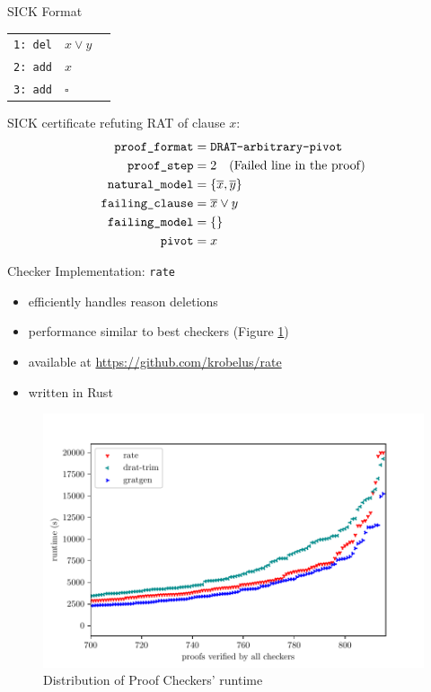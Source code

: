 \documentclass[final,hyperref={pdfpagelabels=true}]{beamer}
\begin{document}
\begin{frame}[fragile]
\begin{columns}[t]
\begin{column}{.45\textwidth}
\begin{block}{SICK Format}
	\begin{tabular}{lll}
    		\texttt{1: del} & $x \lor y$		& \\
    		\texttt{2: add} & $x$			& \\
    		\texttt{3: add} & $\square$		& \\
	\end{tabular}

        \vspace{.5cm}
	SICK certificate refuting RAT of clause $x$:
        \begin{align*}
            \texttt{proof\_format}	&= \texttt{DRAT-arbitrary-pivot}		\\
	    \texttt{proof\_step}	&= 2 \text{\quad (Failed line in the proof)}	\\
	    \texttt{natural\_model}	&= \{\overline{x}, \overline{y}\}		\\
	    \texttt{failing\_clause}	&= \overline{x} \lor y				\\
	    \texttt{failing\_model}	&= \{\}						\\
	    \texttt{pivot}		&= x						
        \end{align*}
    \end{block}
    \begin{block}{Checker Implementation: \texttt{rate}}
        \begin{itemize}
            \item efficiently handles reason deletions
            \item performance similar to best checkers (Figure \ref{fig:cactus-time3})
            \item available at \url{https://github.com/krobelus/rate}
            \item written in Rust
        \end{itemize}
    \begin{figure}
        \centering
        \caption{Distribution of Proof Checkers' runtime\label{fig:cactus-time3}}
        \includegraphics[scale=2]{../p/cactus-time3.pdf}
    \end{figure}


\end{block}
\end{column}
\end{columns}
\end{frame}
\end{document}
